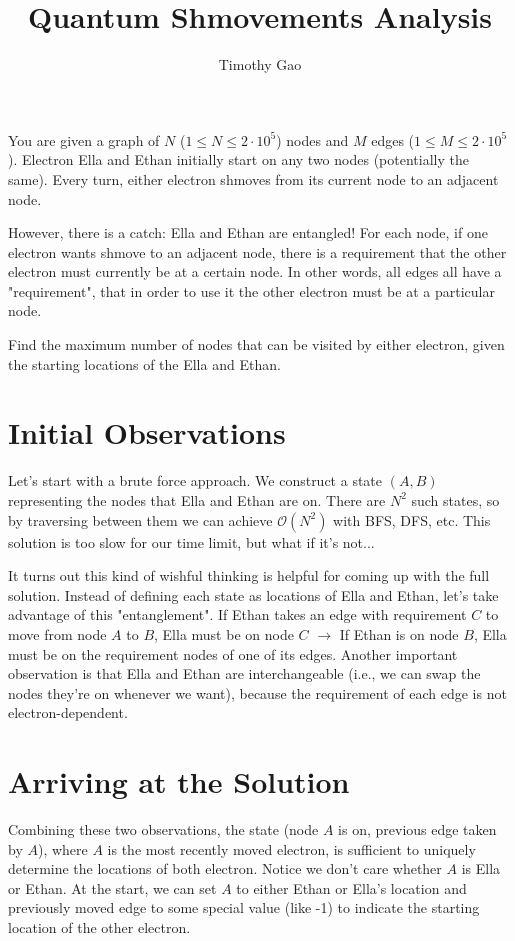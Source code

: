 \documentclass[15pt]{article}
\title{Quantum Shmovements Analysis}
\author{Timothy Gao}
\date{}
\begin{document}
\maketitle

You are given a graph of $N$ ($1 \leq N \leq 2 \cdot 10^5$) nodes and $M$ edges ($1 \leq M \leq 2 \cdot 10^5$). Electron Ella and Ethan initially start on any two nodes (potentially the same). Every turn, either electron shmoves from its current node to an adjacent node.

However, there is a catch: Ella and Ethan are entangled! For each node, if one electron wants shmove to an adjacent node, there is a requirement that the other electron must currently be at a certain node. In other words, all edges all have a "requirement", that in order to use it the other electron must be at a particular node.

Find the maximum number of nodes that can be visited by either electron, given the starting locations of the Ella and Ethan. 

\section{Initial Observations}

Let's start with a brute force approach. We construct a state $(A, B)$ representing the nodes that Ella and Ethan are on. There are $N^2$ such states, so by traversing between them we can achieve $\mathcal{O}(N^2)$ with BFS, DFS, etc. This solution is too slow for our time limit, but what if it's not...

It turns out this kind of wishful thinking is  helpful for coming up with the full solution. Instead of defining each state as locations of Ella and Ethan, let's take advantage of this "entanglement". If Ethan takes an edge with requirement $C$ to move from node $A$ to $B$, Ella must be on node $C$ $\rightarrow$ If Ethan is on node $B$, Ella must be on the requirement nodes of one of its edges. 
Another important observation is that Ella and Ethan are interchangeable (i.e., we can swap the nodes they're on whenever we want), because the requirement of each edge is not electron-dependent.

\section{Arriving at the Solution}

Combining these two observations, the state (node $A$ is on, previous edge taken by $A$), where $A$ is the most recently moved electron, is sufficient to uniquely determine the locations of both electron. Notice we don't care whether $A$ is Ella or Ethan. At the start, we can set $A$ to either Ethan or Ella's location and previously moved edge to some special value (like -1) to indicate the starting location of the other electron.
\end{document}
